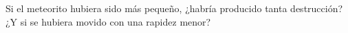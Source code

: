 Si el meteorito hubiera sido más pequeño, ¿habría producido tanta destrucción? ¿Y si se
hubiera movido con una rapidez menor?

\begin{solutionbox}{2cm}
\end{solutionbox}
